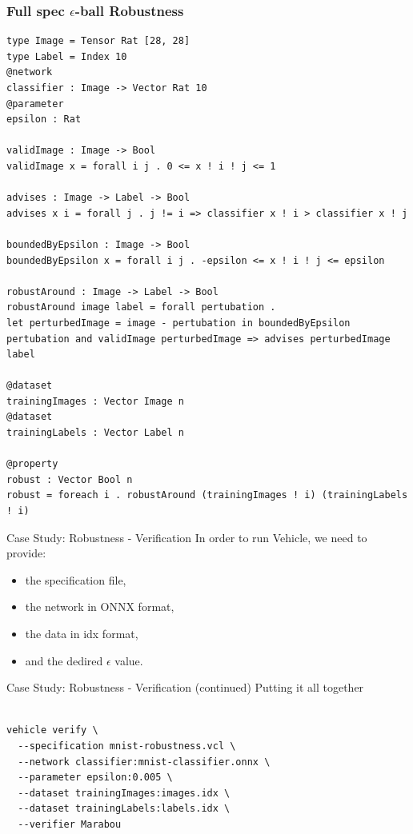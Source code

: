 \documentclass[t,compress,aspectratio=169]{beamer}
\begin{document}
\begin{frame}[fragile]
\frametitle{Full spec $\epsilon$-ball Robustness}
\vspace{-2em}

 \begin{verbatim}
type Image = Tensor Rat [28, 28]
type Label = Index 10
@network
classifier : Image -> Vector Rat 10
@parameter
epsilon : Rat

validImage : Image -> Bool
validImage x = forall i j . 0 <= x ! i ! j <= 1

advises : Image -> Label -> Bool
advises x i = forall j . j != i => classifier x ! i > classifier x ! j

boundedByEpsilon : Image -> Bool
boundedByEpsilon x = forall i j . -epsilon <= x ! i ! j <= epsilon

robustAround : Image -> Label -> Bool
robustAround image label = forall pertubation .
let perturbedImage = image - pertubation in boundedByEpsilon pertubation and validImage perturbedImage => advises perturbedImage label

@dataset
trainingImages : Vector Image n
@dataset
trainingLabels : Vector Label n

@property
robust : Vector Bool n
robust = foreach i . robustAround (trainingImages ! i) (trainingLabels ! i)
\end{verbatim}
\end{frame}



\begin{frame}[fragile]{Case Study: Robustness - Verification}
In order to run Vehicle, we need to provide:

\begin{itemize}
    \item the specification file,
    \item the network in ONNX format,
    \item the data in idx format,
    \item and the dedired $\epsilon$ value.
\end{itemize}





\end{frame}

\begin{frame}[fragile]{Case Study: Robustness - Verification (continued)}
Putting it all together

\begin{verbatim}

vehicle verify \
  --specification mnist-robustness.vcl \
  --network classifier:mnist-classifier.onnx \
  --parameter epsilon:0.005 \
  --dataset trainingImages:images.idx \
  --dataset trainingLabels:labels.idx \
  --verifier Marabou

\end{verbatim}

\end{frame}
\end{document}

